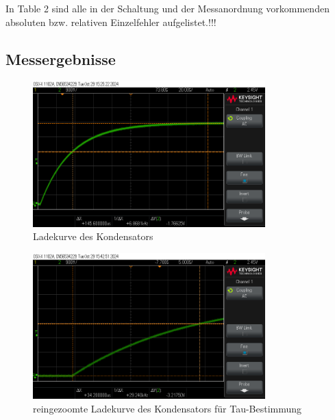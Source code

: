 \documentclass[a4paper,12pt]{article}
\begin{document}
\noindent In Table 2 sind alle in der Schaltung und der Messanordnung vorkommenden absoluten bzw. relativen Einzelfehler aufgelistet.!!!

\subsection{Messergebnisse}

\begin{figure}[H]
    \centering
    \includegraphics[width=0.8\textwidth]{../Quellen/Labor2/scope_0.png}
\caption{Ladekurve des Kondensators}
\end{figure}

\begin{figure}[H]
    \centering
    \includegraphics[width=0.8\textwidth]{../Quellen/Labor2/scope_1.png}
\caption{reingezoomte Ladekurve des Kondensators für Tau-Bestimmung}
\end{figure}
\end{document}
